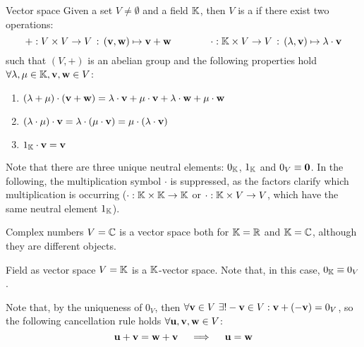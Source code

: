 \begin{definition}{Vector space}{}
  Given a set $ V \neq \emptyset $ and a field $ \mathbb{K} $, then $ V $ is a  if there exist two operations:
  \begin{equation*}
    + : V \times V \rightarrow V \,:\, (\mathbf{v} , \mathbf{w}) \mapsto \mathbf{v} + \mathbf{w}
    \qquad \qquad
    \cdot : \mathbb{K} \times V \rightarrow V \,:\, (\lambda , \mathbf{v}) \mapsto \lambda \cdot \mathbf{v}
  \end{equation*}
  such that $ (V,+) $ is an abelian group and the following properties hold $ \forall \lambda , \mu \in \mathbb{K} , \mathbf{v} , \mathbf{w} \in V $:
  \begin{enumerate}
    \item $ (\lambda + \mu) \cdot (\mathbf{v} + \mathbf{w}) = \lambda \cdot \mathbf{v} + \mu \cdot \mathbf{v} + \lambda \cdot \mathbf{w} + \mu \cdot \mathbf{w} $
    \item $ (\lambda \cdot \mu) \cdot \mathbf{v} = \lambda \cdot (\mu \cdot \mathbf{v}) = \mu \cdot (\lambda \cdot \mathbf{v}) $
    \item $ 1_{\mathbb{K}} \cdot \mathbf{v} = \mathbf{v} $
  \end{enumerate}
\end{definition}

Note that there are three unique neutral elements: $ 0_{\mathbb{K}} $, $ 1_{\mathbb{K}} $ and $ 0_V \equiv \mathbf{0} $.
In the following, the multiplication symbol $ \cdot $ is suppressed, as the factors clarify which multiplication is occurring ($ \cdot : \mathbb{K} \times \mathbb{K} \rightarrow \mathbb{K} $ or $ \cdot : \mathbb{K} \times V \rightarrow V $, which have the same neutral element $ 1_{\mathbb{K}} $).

\begin{example}{Complex numbers}{}
  $ V = \mathbb{C} $ is a vector space both for $ \mathbb{K} = \mathbb{R} $ and $ \mathbb{K} = \mathbb{C} $, although they are different objects.
\end{example}

\begin{example}{Field as vector space}{}
  $ V = \mathbb{K} $ is a $ \mathbb{K} $-vector space. Note that, in this case, $ 0_{\mathbb{K}} \equiv 0_V $.
\end{example}

Note that, by the uniqueness of $ 0_V $, then $ \forall \mathbf{v} \in V \,\,\exists! -\mathbf{v} \in V : \mathbf{v} + (-\mathbf{v}) = 0_V $, so the following cancellation rule holds $ \forall \mathbf{u} , \mathbf{v} , \mathbf{w} \in V $:
\begin{equation}
  \mathbf{u} + \mathbf{v} = \mathbf{w} + \mathbf{v}
  \quad \implies \quad
  \mathbf{u} = \mathbf{w}
  \label{eq:cancellation-rule}
\end{equation}

